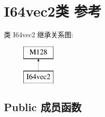 \hypertarget{class_i64vec2}{}\section{I64vec2类 参考}
\label{class_i64vec2}
类 I64vec2 继承关系图\+:\begin{figure}[H]
\begin{center}
\leavevmode
\includegraphics[height=2.000000cm]{class_i64vec2}
\end{center}
\end{figure}
\subsection*{Public 成员函数}
